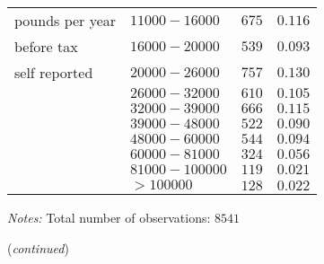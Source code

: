 \documentclass[a4paper,12pt]{article}
\begin{document}
{\begin{threeparttable}
\begin{small}
\begin{tabular}{llrr}
 \vspace{0.15cm}   pounds per year&$11000 - 16000$&$675$&$0.116$\\
\vspace{0.15cm}  before tax &$16000-20000$&$539$&$0.093$\\
 \vspace{0.15cm} self reported&$20000-26000$&$757$&$0.130$\\
 \vspace{0.15cm}  &$26000-32000$&$610$&$0.105$\\
 \vspace{0.15cm}  &$32000-39000$&$666$&$0.115$\\
 \vspace{0.15cm}  &$39000-48000$&$522$&$0.090$\\
 \vspace{0.15cm}  &$48000-60000$&$544$&$0.094$\\
 \vspace{0.15cm}  &$60000-81000$&$324$&$0.056$\\
 \vspace{0.15cm}  &$81000-100000$&$119$&$0.021$\\
 \vspace{0.15cm}  &$>100000$&$128$&$0.022$\\
\hline
\hline
\end{tabular} 
\end{small}
 \begin{tablenotes}
  \begin{footnotesize}
     \item[~]\textit{Notes:} Total number of observations: $8541$\vspace{-0.35cm} \begin{adjustwidth}{0.7cm}{}  
  \item[~]\hfill (\textit{continued})
    \end{adjustwidth}
\singlespacing
  \end{footnotesize}
\end{tablenotes}
  \end{threeparttable} 
\par}
\pagebreak
\end{document}
